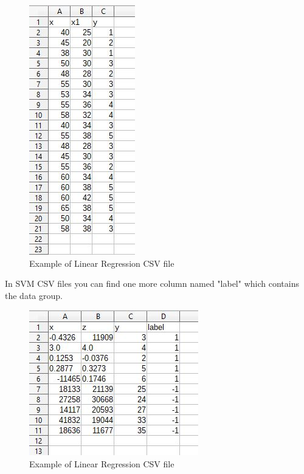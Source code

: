 \begin{figure}[H]
		\centering
		\includegraphics[scale=0.70]{../Developer_manual/img/linear_regression_csv.JPG}
		\caption{Example of Linear Regression CSV file}
	\end{figure}

In SVM CSV files you can find one more column named "label" which contains the data group. 

\begin{figure}[H]
		\centering
		\includegraphics[scale=0.70]{../Developer_manual/img/support_vector_machine_csv.JPG}
		\caption{Example of Linear Regression CSV file}
	\end{figure}
 



